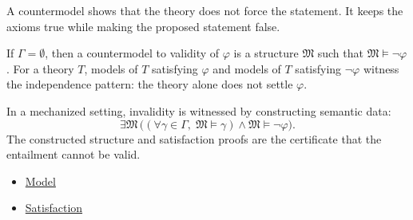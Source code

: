 \begin{remark*}[Interpretation]
A countermodel shows that the theory does not force the statement. It keeps
the axioms true while making the proposed statement false.
\end{remark*}

\begin{remark*}[Exposition]
If $\Gamma=\emptyset$, then a countermodel to validity of $\varphi$ is a
structure $\mathfrak{M}$ such that $\mathfrak{M}\vDash\neg\varphi$. For a
theory $T$, models of $T$ satisfying $\varphi$ and models of $T$ satisfying
$\neg\varphi$ witness the independence pattern: the theory alone does not
settle $\varphi$.
\end{remark*}

\begin{remark*}[Exposition]
In a mechanized setting, invalidity is witnessed by constructing semantic
data:
\[
  \exists\mathfrak{M}\,
  \bigl((\forall\gamma\in\Gamma,\;\mathfrak{M}\vDash\gamma)
  \land
  \mathfrak{M}\vDash\neg\varphi\bigr).
\]
The constructed structure and satisfaction proofs are the certificate that the
entailment cannot be valid.
\end{remark*}

\begin{dependencies}
\begin{itemize}
  \item \hyperref[def:axiom-systems-model]{Model}
  \item \hyperref[def:axiom-systems-satisfaction]{Satisfaction}
\end{itemize}
\end{dependencies}
